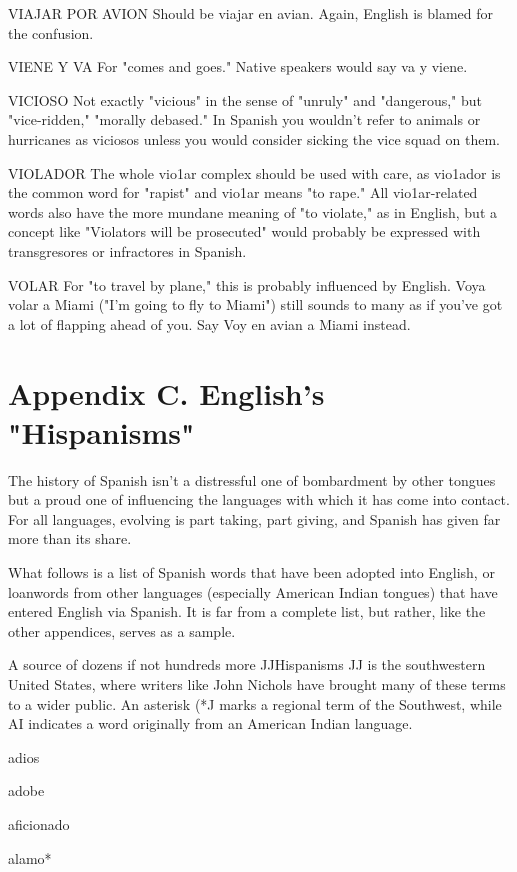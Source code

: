 {VIAJAR POR AVION Should be viajar en avian. Again, English is blamed for the confusion.

VIENE Y VA For "comes and goes." Native speakers would say
va y viene.

VICIOSO Not exactly "vicious" in the sense of "unruly" and
"dangerous," but "vice-ridden," "morally debased." In Spanish you
wouldn't refer to animals or hurricanes as viciosos unless you would
consider sicking the vice squad on them.

VIOLADOR The whole vio1ar complex should be used with
care, as vio1ador is the common word for "rapist" and vio1ar means
"to rape." All vio1ar-related words also have the more mundane meaning of "to violate," as in English, but a concept like "Violators will be
prosecuted" would probably be expressed with transgresores or infractores in Spanish.

VOLAR For "to travel by plane," this is probably influenced
by English. Voya volar a Miami ("I'm going to fly to Miami") still
sounds to many as if you've got a lot of flapping ahead of you. Say Voy
en avian a Miami instead.

\chapter{Appendix C. English's "Hispanisms"}

The history of Spanish isn't a distressful one of bombardment
by other tongues but a proud one of influencing the languages with
which it has come into contact. For all languages, evolving is part taking, part giving, and Spanish has given far more than its share.

What follows is a list of Spanish words that have been adopted
into English, or loanwords from other languages (especially American
Indian tongues) that have entered English via Spanish. It is far from a
complete list, but rather, like the other appendices, serves as a sample.

A source of dozens if not hundreds more JJHispanisms JJ is the
southwestern United States, where writers like John Nichols have
brought many of these terms to a wider public. An asterisk (*J marks a
regional term of the Southwest, while AI indicates a word originally
from an American Indian language.

\bsk

adios

adobe

aficionado

alamo*

}
